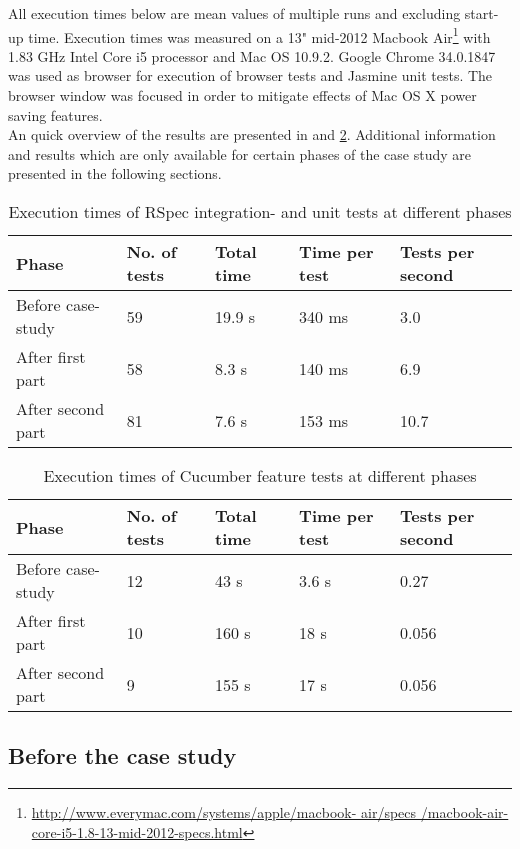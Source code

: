 
All execution times below are mean values of multiple runs and excluding
start-up time. Execution times was measured on a 13" mid-2012 Macbook
Air\footnote{\url{http://www.everymac.com/systems/apple/macbook-
air/specs /macbook-air-core-i5-1.8-13-mid-2012-specs.html}} with 1.83
GHz Intel Core i5 processor and Mac OS 10.9.2. Google Chrome 34.0.1847
was used as browser for execution of browser tests and Jasmine unit
tests. The browser window was focused in order to mitigate effects of
Mac OS X power saving features.\\

An quick overview of the results are presented in 
and \ref{tab:cucumber_times}. Additional information and results which
are only available for certain phases of the case study are presented in
the following sections.\\

\begin{table}[t]
    \centering
    \begin{tabular}{l l l l l}
        Phase & No. of tests & Total time & Time per test & Tests per second\\
        \hline
        Before case-study & 59 & 19.9 s& 340 ms & 3.0 \\
        After first part  & 58 & 8.3 s & 140 ms & 6.9 \\
        After second part & 81 & 7.6 s  & 153 ms & 10.7\\
    \end{tabular}
    \caption{ Execution times of RSpec integration- and unit tests at different phases }
    \label{tab:unit_times}
\end{table}


\begin{table}[t]
    \centering
    \begin{tabular}{l l l l l}
        Phase & No. of tests & Total time & Time per test & Tests per second \\
        \hline
        Before case-study & 12 & 43 s & 3.6 s & 0.27 \\
        After first part  & 10 & 160 s & 18 s & 0.056\\
        After second part & 9 &  155 s & 17 s & 0.056\\
    \end{tabular}
    \caption{ Execution times of Cucumber feature tests at different phases }
    \label{tab:cucumber_times}
\end{table}


\subsection{Before the case study}

